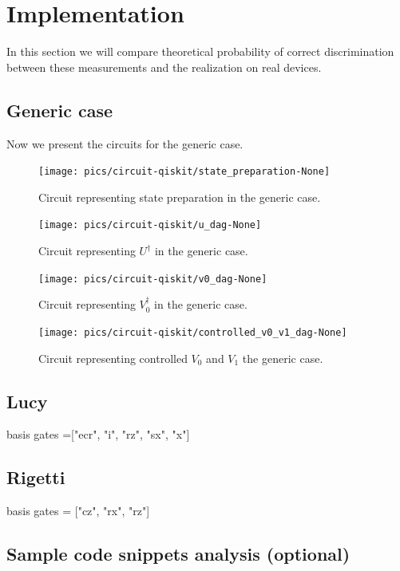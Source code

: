 \documentclass[preprint,12pt, a4paper]{elsarticle}
\newcommand{\1}{{\rm 1\hspace{-0.9mm}l}}
\begin{document}
\section{Implementation}
In this section we will compare theoretical probability of correct 
discrimination between these measurements and the realization on real devices.

\subsection{Generic case}
Now we present the circuits for the generic case.
\begin{figure}[h!]
\centering
\texttt{[image: pics/circuit-qiskit/state\_preparation-None]}
\caption{Circuit representing state preparation in the  generic case.}
\end{figure}
\begin{figure}[h!]
\centering
\texttt{[image: pics/circuit-qiskit/u\_dag-None]}
\caption{Circuit representing $U^\dagger$ in the generic case.}
\end{figure}
\begin{figure}[h!]
\centering
\texttt{[image: pics/circuit-qiskit/v0\_dag-None]}
\caption{Circuit representing $V_0^\dagger$ in the generic case.}
\end{figure}
\begin{figure}[h!]
\centering
\texttt{[image: pics/circuit-qiskit/controlled\_v0\_v1\_dag-None]}
\caption{Circuit representing controlled $V_0$ and $V_1$ the generic case.}
\end{figure}

\subsection{Lucy}
 basis gates  =["ecr", "i", "rz", "sx", "x"] 


\subsection{Rigetti}
 basis gates = ["cz", "rx", "rz"]



\subsection{Sample code snippets analysis (optional)}
\label{}
\end{document}
